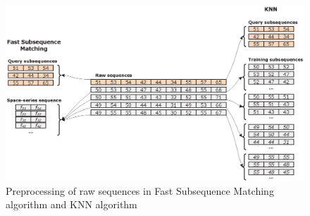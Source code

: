 \begin{figure}[!h]
\centering
\includegraphics[scale=0.60]{Figures/TrainTestSet}
\caption{Preprocessing of raw sequences in Fast Subsequence Matching algorithm and KNN algorithm}
\label{fig:train_test_set}
\end{figure}







